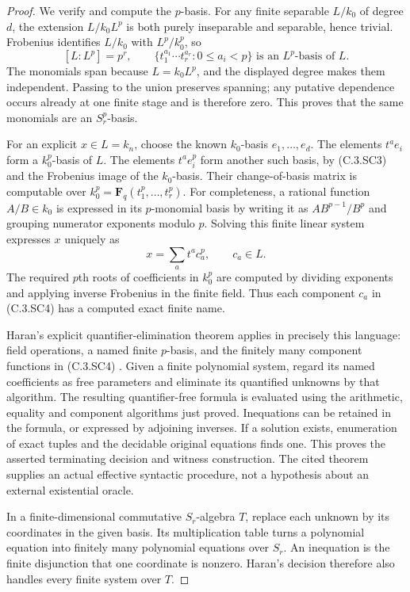 \begin{proof}
We verify and compute the $p$-basis.
For any finite separable $L/k_0$ of
degree $d$, the extension
$L/k_0L^p$ is both purely inseparable
and separable, hence trivial.
Frobenius identifies $L/k_0$ with
$L^p/k_0^p$, so
\[
 [L:L^p]=p^r,
 \qquad
 \{t_1^{a_1}\cdots t_r^{a_r}:0\le a_i<p\}
        \text{ is an }L^p\text{-basis of }L.           \tag{C.3.SC3}
\]
The monomials span because $L=k_0L^p$,
and the displayed degree makes them
independent.
Passing to the union preserves spanning;
any putative dependence occurs already
at one finite stage and is therefore
zero.  This proves that the same
monomials are an $S_r^p$-basis.

For an explicit $x\in L=k_n$, choose
the known $k_0$-basis $e_1,\ldots,e_d$.
The elements $t^a e_i$ form a
$k_0^p$-basis of $L$.
The elements $t^a e_i^p$ form another
such basis, by (C.3.SC3) and the
Frobenius image of the $k_0$-basis.
Their change-of-basis matrix is
computable over
$k_0^p=\mathbf F_q(t_1^p,\ldots,t_r^p)$.
For completeness, a rational function
$A/B\in k_0$ is expressed in its
$p$-monomial basis by writing it as
$AB^{p-1}/B^p$ and grouping numerator
exponents modulo $p$.
Solving this finite linear system
expresses $x$ uniquely as
\[
              x=\sum_a t^a c_a^p,
                     \qquad c_a\in L.                 \tag{C.3.SC4}
\]
The required $p$th roots of coefficients
in $k_0^p$ are computed by dividing
exponents and applying inverse Frobenius
in the finite field.
Thus each component $c_a$ in (C.3.SC4)
has a computed exact finite name.

Haran's explicit quantifier-elimination
theorem applies in precisely this
language: field operations, a named
finite $p$-basis, and the finitely
many component functions in (C.3.SC4)
\cite[Theorem 1.2 and Sections 1--3,
pp. 464--469]{C-HaranSeparablyClosed1988}.
Given a finite polynomial system,
regard its named coefficients as
free parameters and eliminate its
quantified unknowns by that algorithm.
The resulting quantifier-free formula
is evaluated using the arithmetic,
equality and component algorithms
just proved.  Inequations can be
retained in the formula, or expressed
by adjoining inverses.
If a solution exists, enumeration
of exact tuples and the decidable
original equations finds one.
This proves the asserted terminating
decision and witness construction.
The cited theorem supplies an actual
effective syntactic procedure, not
a hypothesis about an external
existential oracle.

In a finite-dimensional commutative
$S_r$-algebra $T$, replace each
unknown by its coordinates in the
given basis.  Its multiplication
table turns a polynomial equation
into finitely many polynomial
equations over $S_r$.
An inequation is the finite
disjunction that one coordinate
is nonzero.  Haran's decision
therefore also handles every
finite system over $T$.


\end{proof}
